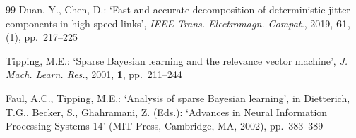 \documentclass[10pt, a4paper, twocolumn]{article}
\begin{document}
\begin{thebibliography}{99}
 Duan, Y., Chen, D.: `Fast and accurate decomposition of deterministic jitter components in high-speed links', \textit{IEEE Trans. Electromagn. Compat.}, 2019, \textbf{61}, (1), pp.~217--225

 Tipping, M.E.: `Sparse Bayesian learning and the relevance vector machine', \textit{J. Mach. Learn. Res.}, 2001, \textbf{1}, pp.~211--244

 Faul, A.C., Tipping, M.E.: `Analysis of sparse Bayesian learning', in Dietterich, T.G., Becker, S., Ghahramani, Z. (Eds.): `Advances in Neural Information Processing Systems 14' (MIT Press, Cambridge, MA, 2002), pp.~383--389

\end{thebibliography}
\end{document}
